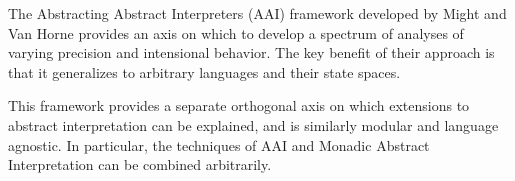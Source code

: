 \label{section:modularity}

The Abstracting Abstract Interpreters (AAI) framework developed by Might and
Van Horne provides an axis on which to develop a spectrum of analyses of
varying precision and intensional behavior.
%
The key benefit of their approach is that it generalizes to arbitrary languages
and their state spaces.

This framework provides a separate orthogonal axis on which extensions to
abstract interpretation can be explained, and is similarly modular and language
agnostic.
%
In particular, the techniques of AAI and Monadic Abstract Interpretation can be
combined arbitrarily.



